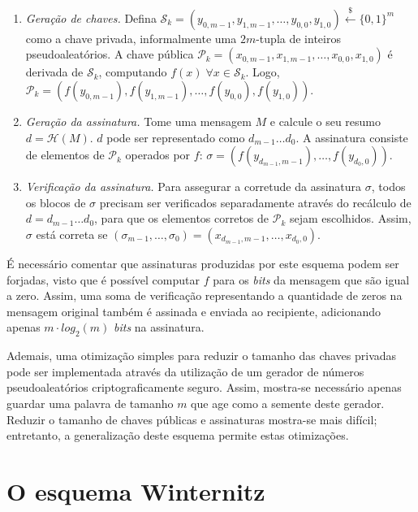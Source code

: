 \documentclass[12pt]{report}
\newcommand{\pk}{$\mathcal{P}_k$}
\newcommand{\sk}{$\mathcal{S}_k$}
\newcommand{\binwds}[1]{\{0, 1\}^{#1}}
\begin{document}
\begin{enumerate}

    \item[] \emph{Geração de chaves.} Defina $\text{\sk{}} = (y_{0, m-1}, y_{1, m-1}, \dots, y_{0,0}, y_{1,0}) \stackrel{\$}{\longleftarrow} \binwds{m}$ como a chave privada, informalmente uma $2m$-tupla de inteiros pseudoaleatórios. A chave pública $\text{\pk{}} = (x_{0, m-1}, x_{1, m-1}, \dots, x_{0,0}, x_{1,0})$ é derivada de \sk{}, computando $f(x) \; \forall x \in  \text{\sk{}}$. Logo, $\text{\pk{}} = (f(y_{0, m-1}), f(y_{1, m-1}), \dots, f(y_{0,0}), f(y_{1,0}))$.

    \item[] \emph{Geração da assinatura.} Tome uma mensagem $M$ e calcule o seu resumo $d = \mathcal{H}(M)$. $d$ pode ser representado como $d_{m-1} \dots d_0$. A assinatura consiste de elementos de \pk{} operados por $f$: $\sigma = (f(y_{d_{m-1}, m-1}), \dots, f(y_{d_0, 0}))$.
    
    \item[] \emph{Verificação da assinatura.} Para assegurar a corretude da assinatura $\sigma$, todos os blocos de $\sigma$ precisam ser verificados separadamente através do recálculo de $d = d_{m-1} \dots d_0$, para que
    os elementos corretos de \pk{} sejam escolhidos. Assim, $\sigma$ está
    correta se $(\sigma_{m-1}, \dots, \sigma_0) = (x_{d_{m-1}, m-1}, \dots, x_{d_{0}, 0})$.
    
\end{enumerate}

É necessário comentar que assinaturas produzidas por este esquema podem ser
forjadas, visto que é possível computar $f$ para os \emph{bits} da mensagem
que são igual a zero. Assim, uma soma de verificação representando a
quantidade de zeros na mensagem original também é assinada e enviada ao
recipiente, adicionando apenas $m \cdot log_2(m)$ \emph{bits} na assinatura.

Ademais, uma otimização simples para reduzir o tamanho das chaves privadas pode ser
implementada através da utilização de um gerador de números pseudoaleatórios
criptograficamente seguro. Assim, mostra-se necessário apenas guardar uma
palavra de tamanho $m$ que age como a semente deste gerador. Reduzir
o tamanho de chaves públicas e assinaturas mostra-se mais difícil; entretanto,
a generalização deste esquema permite estas otimizações.

\section{O esquema Winternitz}
\end{document}
